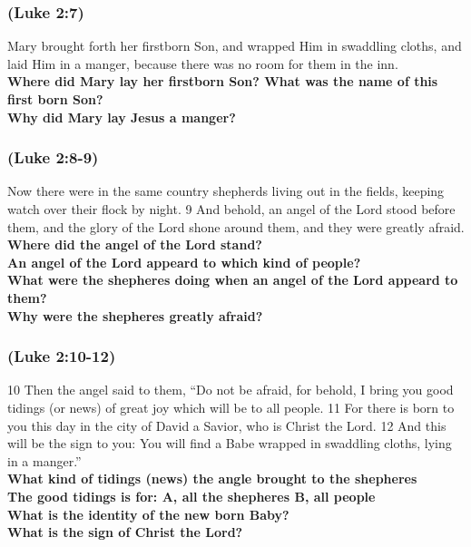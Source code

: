 \newpage

\subsubsection{(Luke 2:7) }
Mary brought forth her firstborn Son, and wrapped Him in swaddling cloths, and laid Him in a manger, because there was no room for them in the inn.\\
\textbf{Where did Mary lay her firstborn Son? What was the name of this first born Son?}\\
\textbf{Why did Mary lay Jesus a manger?}\\

\subsubsection{(Luke 2:8-9) }
Now there were in the same country shepherds living out in the fields, keeping watch over their flock by night. 9 And behold, an angel of the Lord stood before them, and the glory of the Lord shone around them, and they were greatly afraid. \\
\textbf{Where did the angel of the Lord stand?}\\
\textbf{An angel of the Lord appeard to which kind of people?}\\
\textbf{What were the shepheres doing when an angel of the Lord appeard to them?}\\
\textbf{Why were the shepheres greatly afraid?}\\

\subsubsection{(Luke 2:10-12) }
10 Then the angel said to them, “Do not be afraid, for behold, I bring you good tidings (or news) of great joy which will be to all people. 11 For there is born to you this day in the city of David a Savior, who is Christ the Lord. 12 And this will be the sign to you: You will find a Babe wrapped in swaddling cloths, lying in a manger.”\\
\textbf{What kind of tidings (news) the angle brought to the shepheres}\\
\textbf{The good tidings is for:\hspace{1cm}  A, all the shepheres \hspace{1cm} B, all people}\\
\textbf{What is the identity of the new born Baby?}\\
\textbf{What is the sign of Christ the Lord?}\\


